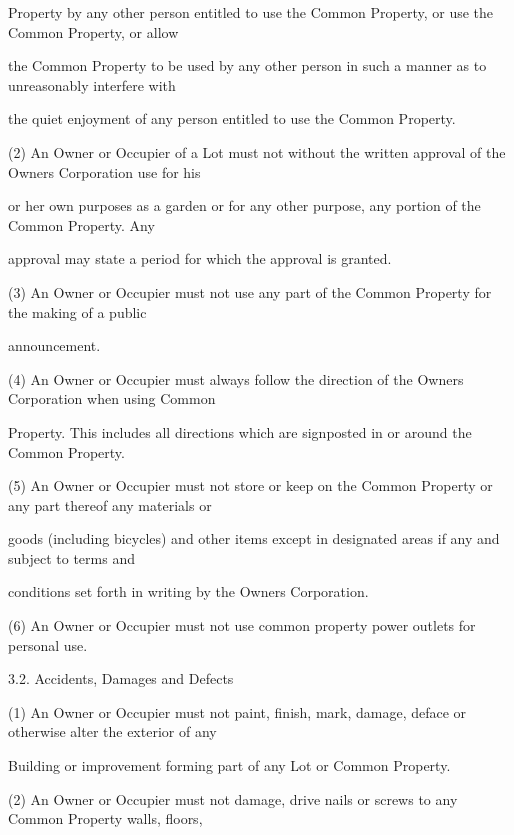 \documentclass{article}
\begin{document}
{\fontsize{10.02}{1}Property by any other person entitled to use the Common Property, or use the Common Property, or allow }

{\fontsize{10.02}{1}the Common Property to be used by any other person in such a manner as to unreasonably interfere with }

{\fontsize{10.02}{1}the quiet enjoyment of any person entitled to use the Common Property. }

{\fontsize{9.962}{1}(2) An Owner or Occupier of a Lot must not without the written approval of the Owners Corporation use for his }

{\fontsize{10.02}{1}or her own purposes as a garden or for any other purpose, any portion of the Common Property. Any }

{\fontsize{10.02}{1}approval may state a period for which the approval is granted. }

{\fontsize{9.962}{1}(3) An Owner or Occupier must not use any part of the Common Property for the making of a public }

{\fontsize{10.02}{1}announcement. }

{\fontsize{9.962}{1}(4) An Owner or Occupier must always follow the direction of the Owners Corporation when using Common }

{\fontsize{10.02}{1}Property. This includes all directions which are signposted in or around the Common Property. }

{\fontsize{9.962}{1}(5) An Owner or Occupier must not store or keep on the Common Property or any part thereof any materials or }

{\fontsize{10.02}{1}goods (including bicycles) and other items except in designated areas if any and subject to terms and }

{\fontsize{10.02}{1}conditions set forth in writing by the Owners Corporation. }

{\fontsize{9.962}{1}(6) An Owner or Occupier must not use common property power outlets for personal use. }

{\fontsize{9.99}{1}3.2. Accidents, Damages and Defects }

{\fontsize{9.962}{1}(1) An Owner or Occupier must not paint, finish, mark, damage, deface or otherwise alter the exterior of any }

{\fontsize{10.02}{1}Building or improvement forming part of any Lot or Common Property. }

{\fontsize{9.962}{1}(2) An Owner or Occupier must not damage, drive nails or screws to any Common Property walls, floors, }
\end{document}
